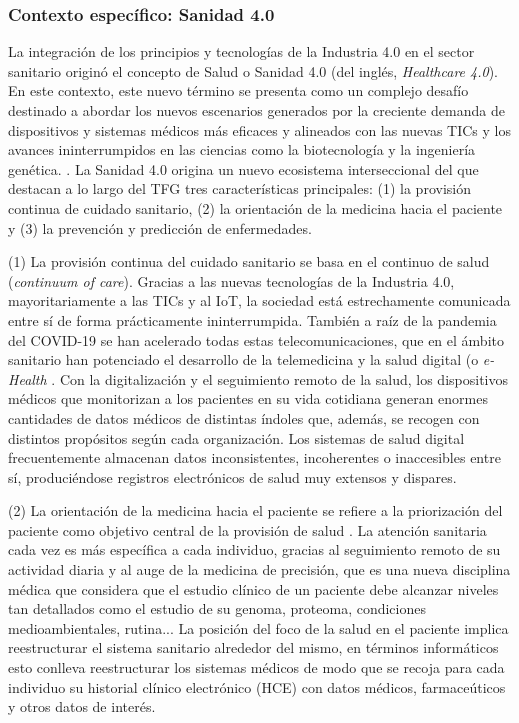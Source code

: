 
\subsubsection{Contexto específico: Sanidad 4.0}

La integración de los principios y tecnologías de la Industria 4.0 en el sector sanitario originó el concepto de Salud o Sanidad 4.0 (del inglés, \textit{Healthcare 4.0})\cite{tortorella2020healthcare}\cite{tortorella2021impacts}.  %
En este contexto, este nuevo término se presenta como un complejo desafío  destinado a abordar los nuevos escenarios generados por la creciente demanda de dispositivos y sistemas médicos más eficaces y alineados con las nuevas TICs y los avances ininterrumpidos en las ciencias como la biotecnología y la ingeniería genética. \cite{martin2021ehealth}. La Sanidad 4.0 origina un nuevo ecosistema interseccional del que destacan a lo largo del TFG  tres  características principales: (1) la provisión continua de cuidado sanitario, (2) la orientación de la medicina hacia el paciente y (3) la prevención y predicción de enfermedades.


(1) La provisión continua del cuidado sanitario se basa en el continuo de salud (\textit{continuum of care}). Gracias a las nuevas tecnologías de la Industria 4.0, mayoritariamente a las TICs y al IoT, la sociedad está estrechamente comunicada entre sí de forma prácticamente ininterrumpida. También a raíz de la pandemia del COVID-19 se han acelerado todas estas telecomunicaciones, que en el ámbito sanitario han potenciado el desarrollo de la telemedicina y la salud digital (o \textit{e-Health} \cite{martin2021ehealth}. Con la digitalización y el seguimiento remoto de la salud, los dispositivos médicos que monitorizan a los pacientes en su vida cotidiana generan enormes cantidades de datos médicos de distintas índoles que, además, se recogen con distintos propósitos según cada organización. Los sistemas de salud digital frecuentemente almacenan datos inconsistentes, incoherentes o inaccesibles entre sí, produciéndose registros electrónicos de salud muy extensos y dispares. 


(2) La orientación de la medicina hacia el paciente se refiere a la priorización del paciente como objetivo central de la provisión de salud  \cite{tortorella2020healthcare}. La atención sanitaria cada vez es más específica a cada individuo, gracias al seguimiento remoto de su actividad diaria y al auge de la medicina de precisión, que es una nueva disciplina médica que considera que el estudio clínico de un paciente debe alcanzar niveles tan detallados como el estudio de su genoma, proteoma, condiciones medioambientales, rutina... La posición del foco de la salud en el paciente implica reestructurar el sistema sanitario alrededor del mismo, en términos informáticos esto conlleva reestructurar los sistemas médicos de modo que se recoja para cada individuo su historial clínico electrónico (HCE) con datos médicos, farmaceúticos y otros datos de interés. 


